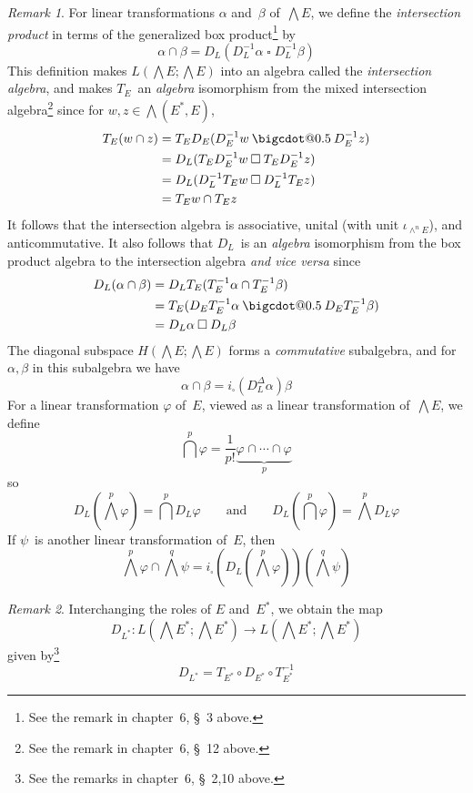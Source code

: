 \documentclass[letterpaper,12pt]{article}
\makeatletter
\newcommand{\bigcdot}[1]{\mathbin{\mathpalette\bigcdot@{#1}}}
\newcommand{\bigcdot@}[2]{%
  \sbox0{$#1\vcenter{}$}%
  \sbox2{$#1\cdot\m@th$}%
  \hbox{%
    \hfil
    \raise\ht0\hbox{%
      \scalebox{#2}{%
        \lower\ht0\hbox{$#1\bullet\m@th$}%
      }%
    }%
    \hfil
  }%
}
\newcommand{\sect}{\cap}
\newcommand{\bigsect}{\bigcap}
\newcommand{\medsect}{{\textstyle\bigsect}}
\newcommand{\after}{\circ}
\newcommand{\eprod}{\wedge}
\newcommand{\bigeprod}{\bigwedge}
\newcommand{\medeprod}{{\textstyle\bigeprod}}
\newcommand{\mprod}{\bigcdot{0.5}}
\newcommand{\bprod}{\mathbin{\square}}
\newcommand{\multi}[4]{#2_{#3}#1\cdots#1#2_{#4}}
\newcommand{\sects}[3]{\multi{\sect}{#1}{#2}{#3}}
\theoremstyle{definition}
\theoremstyle{remark}
\newtheorem*{rmk}{Remark}
\makeatother
\begin{document}
\begin{rmk}
For linear transformations \(\alpha\) and~\(\beta\) of~\(\medeprod E\), we define the \emph{intersection product} in terms of the generalized box product\footnote{See the remark in chapter~6, \S~3 above.} by
\[\alpha\sect\beta=D_L(D_L^{-1}\alpha\bprod D_L^{-1}\beta)\]
This definition makes \(L(\medeprod E;\medeprod E)\) into an algebra called the \emph{intersection algebra}, and makes \(T_E\)~an \emph{algebra} isomorphism from the mixed intersection algebra\footnote{See the remark in chapter~6, \S~12 above.} since for \(w,z\in\medeprod(E^*,E)\),
\begin{align*}
T_E(w\sect z)&=T_ED_E(D_E^{-1}w\mprod D_E^{-1}z)\\
	&=D_L(T_ED_E^{-1}w\bprod T_ED_E^{-1}z)\\
	&=D_L(D_L^{-1}T_Ew\bprod D_L^{-1}T_Ez)\\
	&=T_Ew\sect T_Ez
\end{align*}
It follows that the intersection algebra is associative, unital (with unit \(\iota_{\eprod^n E}\)), and anticommutative. It also follows that \(D_L\)~is an \emph{algebra} isomorphism from the box product algebra to the intersection algebra \emph{and vice versa} since
\begin{align*}
D_L(\alpha\sect\beta)&=D_LT_E(T_E^{-1}\alpha\sect T_E^{-1}\beta)\\
	&=T_E(D_ET_E^{-1}\alpha\mprod D_ET_E^{-1}\beta)\\
	&=D_L\alpha\bprod D_L\beta
\end{align*}
The diagonal subspace \(H(\medeprod E;\medeprod E)\) forms a \emph{commutative} subalgebra, and for \(\alpha,\beta\) in this subalgebra we have
\[\alpha\sect\beta=i_{\bprod}(D_L^{\Delta}\alpha)\beta\]
For a linear transformation \(\varphi\) of~\(E\), viewed as a linear transformation of~\(\medeprod E\), we define
\[\medsect^p\varphi=\frac{1}{p!}\underbrace{\sects{\varphi}{}{}}_p\]
so
\[D_L(\medeprod^p\varphi)=\medsect^p D_L\varphi\qquad\text{and}\qquad D_L(\medsect^p\varphi)=\medeprod^p D_L\varphi\]
If \(\psi\)~is another linear transformation of~\(E\), then
\[\medeprod^p\varphi\sect\medeprod^q\psi=i_{\bprod}(D_L(\medeprod^p\varphi))(\medeprod^q\psi)\]
\end{rmk}


\begin{rmk}
Interchanging the roles of \(E\) and~\(E^*\), we obtain the map
\[D_{L^*}:L(\medeprod E^*;\medeprod E^*)\to L(\medeprod E^*;\medeprod E^*)\]
given by\footnote{See the remarks in chapter~6, \S~2,10 above.}
\[D_{L^*}=T_{E^*}\after D_{E^*}\after T_{E^*}^{-1}\]
\end{rmk}
\end{document}
